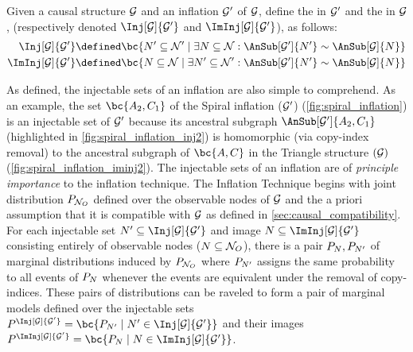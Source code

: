 \documentclass[aps, 10pt, english, twoside, pra, nofootinbib, tightenlines, longbibliography, superscriptaddress]{revtex4-1}
\begin{document}
    \begin{definition}
        Given a causal structure $\mathcal{G}$ and an inflation $\mathcal{G}'$ of $\mathcal{G}$, define the  in $\mathcal{G}'$ and the  in $\mathcal{G}$, (respectively denoted $\Inj[\graph]{\graph'}$ and $\ImInj[\graph]{\graph'}$), as follows:
        \begin{align*}
            \Inj[\graph]{\graph'} &\defined \bc{N' \subseteq \nodes' \mid \exists N \subseteq \nodes : \AnSub[\graph']{N'} \sim \AnSub[\graph]{N}} \\
            \ImInj[\graph]{\graph'} &\defined \bc{N \subseteq \nodes \mid \exists N' \subseteq \nodes' : \AnSub[\graph']{N'} \sim \AnSub[\graph]{N}}
        \end{align*}
    \end{definition}

    As defined, the injectable sets of an inflation are also simple to comprehend. As an example, the set $\bc{A_2, C_1}$ of the Spiral inflation ($\mathcal{G}'$) (\cref{fig:spiral_inflation}) is an injectable set of $\mathcal{G}'$ because its ancestral subgraph $\AnSub[\graph']{A_2, C_1}$ (highlighted in \cref{fig:spiral_inflation_inj2}) is homomorphic (via copy-index removal) to the ancestral subgraph of $\bc{A, C}$ in the Triangle structure $(\mathcal{G})$ (\cref{fig:spiral_inflation_iminj2}). The injectable sets of an inflation are of \textit{principle importance} to the inflation technique. The Inflation Technique begins with joint distribution $\prob[\nodes_O]$ defined over the observable nodes of $\mathcal{G}$ and the a priori assumption that it is compatible with $\mathcal{G}$ as defined in \cref{sec:causal_compatibility}. For each injectable set $N' \subseteq \Inj[\graph]{\graph'}$ and image $N \subseteq \ImInj[\graph]{\graph'}$ consisting entirely of observable nodes ($N \subseteq \mathcal{N}_O$), there is a pair $\prob[N], \prob[N']$ of marginal distributions induced by $\prob[\nodes_O]$ where $\prob[N']$ assigns the same probability to all events of $\prob[N]$ whenever the events are equivalent under the removal of copy-indices. These pairs of distributions can be raveled to form a pair of marginal models defined over the injectable sets $\prob^{\Inj[\graph]{\graph'}} = \bc{\prob[N'] \mid N' \in \Inj[\graph]{\graph'}}$ and their images $\prob^{\ImInj[\graph]{\graph'}} = \bc{\prob[N] \mid N \in \ImInj[\graph]{\graph'}}$.

\end{document}
